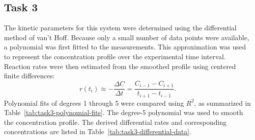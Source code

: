 \subsection{Task 3}

The kinetic parameters for this system were determined using the differential
method of van't Hoff. Because only a small number of data points were
available, a polynomial was first fitted to the measurements. This
approximation was used to represent the concentration profile over the
experimental time interval. Reaction rates were then estimated from the
smoothed profile using centered finite differences:
\begin{equation}
  r(t_i) \approx -\frac{\Delta C}{\Delta t}
    = \frac{C_{i-1}-C_{i+1}}{t_{i+1}-t_{i-1}}.
  \label{eq:task3-rate-estimate}
\end{equation}
Polynomial fits of degrees 1 through 5 were compared using \(R^2\), as
summarized in Table~\ref{tab:task3-polynomial-fits}. The degree-5 polynomial
was used to smooth the concentration profile. The derived differential rates
and corresponding concentrations are listed in
Table~\ref{tab:task3-differential-data}.

